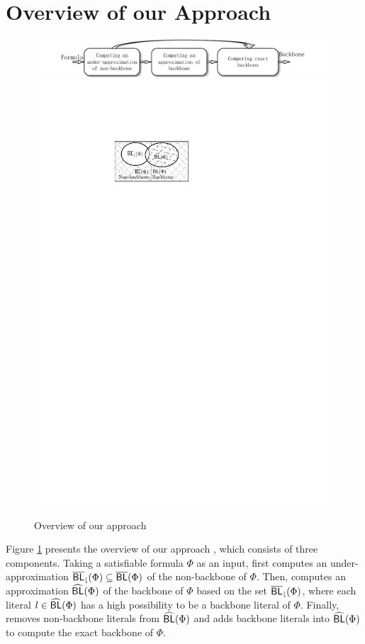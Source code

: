 \section{Overview of our Approach}\label{sec:overview}
\begin{figure}[t]
   \includegraphics[scale=0.75]{Framework}
  \hspace*{50mm} \includegraphics[scale=0.75]{Fig-backbone}
   \caption{Overview of our approach}
   \label{flow}
\end{figure}

Figure \ref{flow} presents the overview of our approach \tool, which consists of three components. Taking a satisfiable formula
$\Phi$ as an input, \tool first computes an under-approximation ${\sf \overline{BL}_\downharpoonright}(\Phi)\subseteq \overline{\textsf{BL}}(\Phi)$ of the non-backbone of
$\Phi$. Then, \tool computes an approximation ${\sf \widehat{BL}}(\Phi)$ of the backbone of $\Phi$ based on the set ${\sf \overline{BL}_\downharpoonright}(\Phi)$, where each literal $l\in {\sf \widehat{BL}}(\Phi)$ has a high possibility to be a backbone literal of $\Phi$.
Finally, \tool removes non-backbone literals from ${\sf \widehat{BL}}(\Phi)$ and adds backbone literals into ${\sf \widehat{BL}}(\Phi)$ to compute the exact backbone of $\Phi$.


